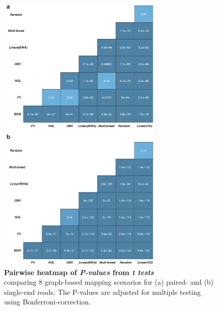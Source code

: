 \documentclass[../main.tex]{subfiles}
\begin{document}
\begin{flushleft}
\begin{figure}[!htb]
    \centering
    \includegraphics[width=0.7\textwidth]{paper2/supplement/sp39.pdf}
    \caption[Pairwise heatmap of 8 graphs comparison]{\textbf{Pairwise heatmap of \emph{P-values} from \emph{t tests}} \\
    \small{comparing 8 graph-based
    mapping scenarios for (a) paired- and (b) single-end reads. The P-values are
    adjusted for multiple testing using Bonferroni-correction.}}
    \label{sup_fig:s39}
\end{figure}


\end{flushleft}
\end{document}
